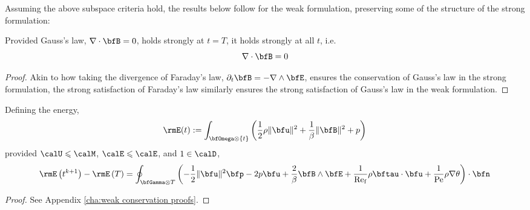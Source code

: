     \line

    Assuming the above subspace criteria hold, the results below follow for the weak formulation, preserving some of the structure of the strong formulation:
    
    \begin{theorem}
        Provided Gauss's law, $\nabla\cdot\bfB  =  0$, holds strongly at $t = T$, it holds strongly at all $t$, i.e.
        \begin{equation}
            \nabla\cdot\bfB  =  0
        \end{equation}
    \end{theorem}
    \begin{proof}
        Akin to how taking the divergence of Faraday's law, $\partial_{t}\bfB  =  - \nabla\wedge\bfE$, ensures the conservation of Gauss's law in the strong formulation, the strong satisfaction of Faraday's law similarly ensures the strong satisfaction of Gauss's law in the weak formulation.
    \end{proof}
    
    \begin{theorem}
        Defining the energy,
        \begin{equation}
            \rmE(t)  :=  \int_{\bfOmega\otimes\{t\}}\left(\frac{1}{2}\rho\|\bfu\|^{2} + \frac{1}{\beta}\|\bfB\|^{2} + p\right)
        \end{equation}
        provided $\calU  \leqslant  \calM$, $\calE 
         \leqslant  \calE$, and $1  \in  \calD$,
        \begin{equation}
            \rmE\left(t^{k + 1}\right) - \rmE\left(T\right)  =  \oint_{\bfGamma\otimes T}\left(- \frac{1}{2}\|\bfu\|^{2}\bfp - 2p\bfu + \frac{2}{\beta}\bfB\wedge\bfE + \frac{1}{\rmRef}\rho\bftau\cdot\bfu + \frac{1}{\rmPe}\rho\nabla\theta\right)\cdot\bfn
        \end{equation}
    \end{theorem}
    \begin{proof}
        See Appendix \ref{cha:weak conservation proofs}.
    \end{proof}

